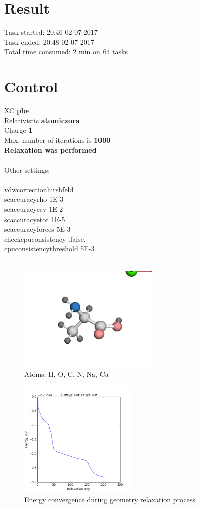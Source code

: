 \documentclass[12pt,a4paper,twocolumn]{report}
\begin{document}
\section*{Result}
Task started: \hfill 20:46 02-07-2017
\\
Task ended: \hfill 20:48 02-07-2017
\\
Total time consumed: 2 min on 64 tasks\\
\section*{Control}
XC  \hfill \textbf{pbe}\\
Relativistic  \hfill \textbf{atomic\textunderscore zora}\\
Charge  \hfill \textbf{1}\\
Max. number of iterations is \hfill \textbf{1000}\\
\textbf{Relaxation was performed\\}
\\
Other settings:\\
\\
vdw\textunderscore correction\textunderscore hirshfeld\\
sc\textunderscore accuracy\textunderscore rho    1E-3\\
sc\textunderscore accuracy\textunderscore eev    1E-2\\
sc\textunderscore accuracy\textunderscore etot   1E-5\\
sc\textunderscore accuracy\textunderscore forces 5E-3\\
check\textunderscore cpu\textunderscore consistency .false.\\
cpu\textunderscore consistency\textunderscore threshold 5E-3\\
\\
\newpage
\begin{figure}[h!]
\caption{Atoms: H, O, C, N, Na, Ca } 
\includegraphics[width=0.6\textwidth]{geometry.png}
\end{figure}
\begin{figure}[H]
\caption{Energy convergence during geometry relaxation process.} 
\includegraphics[width=0.5\textwidth]{energy_convergence.png}
\end{figure}
\end{document}
